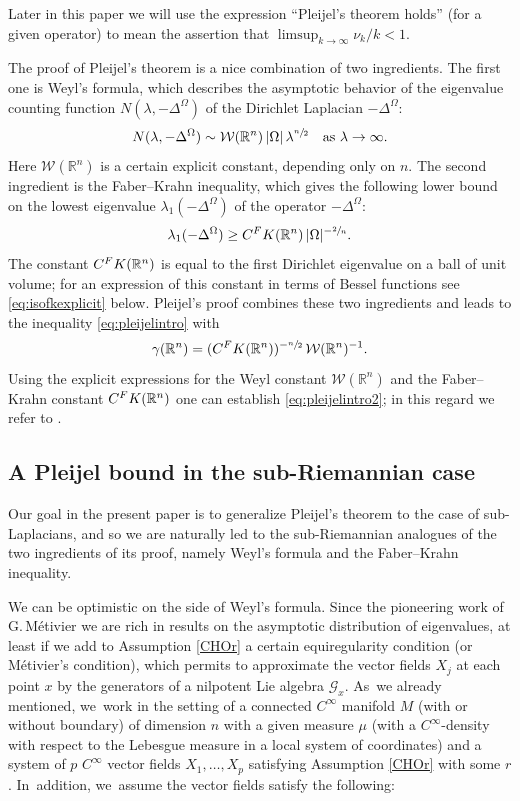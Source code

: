 \documentclass[11pt]{article}
\let\oldsfrac\sfrac
\renewcommand{\sfrac}[2]{{\oldsfrac{#1}{#2}}}
\newcommand{\FK}{\textup{FK}}
\theoremstyle{definition}
\newcommand{\1}{\mathbbm{1}}
\newcommand{\R}{\mathbb{R}}
\numberwithin{equation}{section}
\begin{document}
Later in this paper we will use the expression ``Pleijel's theorem holds'' (for a given operator) to mean the assertion that $\limsup_{k\to\infty} \nu_k/k<1$.

The proof of Pleijel's theorem is a nice combination of two ingredients. The first one is Weyl's formula, which describes the asymptotic behavior of the eigenvalue counting function $N(\lambda,-\Delta^\Omega)$ of the Dirichlet Laplacian $-\Delta^\Omega$:
\[
N(\lambda, -\Delta^\Omega) \sim \mathcal W(\mathbb R^n) \,|\Omega|\,\lambda^{\sfrac n2}
\quad\text{as}\ \lambda\to\infty.
\]
Here $\mathcal W(\R^n)$ is a certain explicit constant, depending only on $n$. The second ingredient is the Faber--Krahn inequality, which gives the following lower bound on the lowest eigenvalue $\lambda_1(-\Delta^\Omega)$ of the operator $-\Delta^\Omega$:
\[
\lambda_1(-\Delta^{\Omega}) \geq C^\FK(\R^n) \,|\Omega|^{-\sfrac 2n}.
\]
The constant $C^\FK(\R^n)$ is equal to the first Dirichlet eigenvalue on a ball of unit volume; for an expression of this constant in terms of Bessel functions see \eqref{eq:isofkexplicit} below. Pleijel's proof combines these two ingredients and leads to the inequality \eqref{eq:pleijelintro} with
\begin{equation}\label{PlConst}
\gamma (\R^n)= (C^\FK(\R^n))^{-\sfrac n2} \,\mathcal W(\mathbb R^n)^{-1}.
\end{equation}
Using the explicit expressions for the Weyl constant $\mathcal W(\mathbb R^n)$ and the Faber--Krahn constant $C^\FK(\R^n)$ one can establish \eqref{eq:pleijelintro2}; in this regard we refer to \cite[Part\,II, Lem.\,9]{BerMe}.

\subsection{A Pleijel bound in the sub-Riemannian case}
Our goal in the present paper is to generalize Pleijel's theorem to the case of sub-Laplacians, and so we are naturally led to the sub-Riemannian analogues of the two ingredients of its proof, namely Weyl's formula and the Faber--Krahn inequality.

We can be optimistic on the side of Weyl's formula. Since the pioneering work of G.\,Métivier \cite{Me} we are rich in results on the asymptotic distribution of eigenvalues, at least if we add to Assumption \ref{CHOr} a certain equiregularity condition (or Métivier's condition), which permits to approximate the vector fields $X_j$ at each point $x$ by the generators of a nilpotent Lie algebra $\mathcal G_x$. As~we already mentioned, we~work in the setting of a connected $C^\infty$ manifold $M$ (with or without boundary) of dimension $n$ with a given measure $\mu$ (with a $C^\infty$-density with respect to the Lebesgue measure in a local system of coordinates) and a system of $p$ $C^\infty$ vector fields $X_1,\ldots,X_p$ satisfying Assumption \ref{CHOr} with some $r$. In~addition, we~assume the vector fields satisfy the following:
\end{document}
